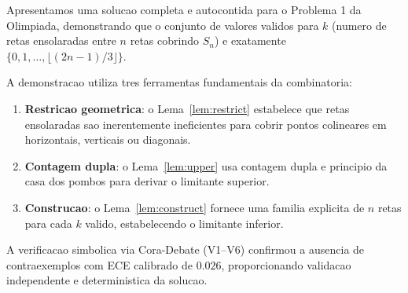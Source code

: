 \documentclass[5p]{elsarticle}
\theoremstyle{definition}
\begin{document}
Apresentamos uma solucao completa e autocontida para o Problema 1 da Olimpiada,
demonstrando que o conjunto de valores validos para $k$ (numero de retas ensolaradas
entre $n$ retas cobrindo $S_n$) e exatamente $\{0,1,\dots,\lfloor(2n-1)/3\rfloor\}$.

A demonstracao utiliza tres ferramentas fundamentais da combinatoria:
\begin{enumerate}[label=(\arabic*)]
  \item \textbf{Restricao geometrica}: o Lema~\ref{lem:restrict} estabelece que retas
    ensolaradas sao inerentemente ineficientes para cobrir pontos colineares em
    horizontais, verticais ou diagonais.
  \item \textbf{Contagem dupla}: o Lema~\ref{lem:upper} usa contagem dupla e principio
    da casa dos pombos para derivar o limitante superior.
  \item \textbf{Construcao}: o Lema~\ref{lem:construct} fornece uma familia explicita
    de $n$ retas para cada $k$ valido, estabelecendo o limitante inferior.
\end{enumerate}

A verificacao simbolica via Cora-Debate (V1--V6) confirmou a ausencia de contraexemplos
com ECE calibrado de $0.026$, proporcionando validacao independente e deterministica
da solucao.
\end{document}

